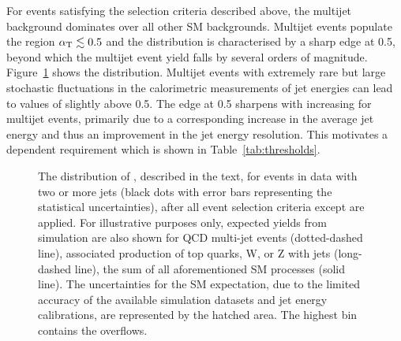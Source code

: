 For events satisfying the selection criteria described above, the
multijet background dominates over all other SM backgrounds. Multijet
events populate the region $\alpha_{\text T} \lesssim 0.5$ and the \alphat
distribution is characterised by a sharp edge at 0.5, beyond which the
multijet event yield falls by several orders of magnitude. Figure~\ref{fig:alphat} shows the \alphat distribution.
Multijet events with extremely rare but large stochastic fluctuations in the
calorimetric measurements of jet energies can lead to values of
\alphat slightly above 0.5. The edge at 0.5 sharpens with increasing
\scalht for multijet events, primarily due to a corresponding increase
in the average jet energy and thus an improvement in the jet energy
resolution. This motivates a \scalht dependent \alphat requirement which is shown in Table~\ref{tab:thresholds}.

\begin{figure}[bht]
  \begin{center} 
    \caption{\label{fig:alphat} The distribution of \alphat,
      described in the text, for events in data with two or more jets
      (black dots with error bars representing the statistical
      uncertainties), after all event selection criteria except
      \alphat are applied. For
      illustrative purposes only, expected yields from simulation are
      also shown for QCD multi-jet events (dotted-dashed line),
      associated production of top quarks, W, or Z with jets
      (long-dashed line), the sum of all aforementioned SM processes
      (solid line).
      The uncertainties for the SM expectation, due to the limited
      accuracy of the available simulation datasets and jet energy
      calibrations, are represented by the hatched area. The highest
      bin contains the overflows.}
    \end{center}
\end{figure}

